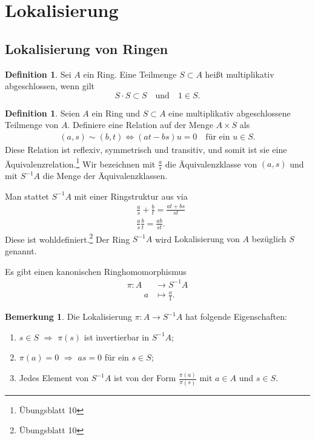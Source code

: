 \documentclass[reqno,12pt]{article}
\numberwithin{equation}{section}
\theoremstyle{plain}
\theoremstyle{definition}
\newtheorem{definition}[thm]{Definition}
\newtheorem{remark}[thm]{Bemerkung}
\begin{document}
\newpage
\section{Lokalisierung}


\subsection{Lokalisierung von Ringen}

\begin{definition}
Sei $A$ ein Ring. Eine Teilmenge $S \subset A$ heißt {\sf multiplikativ abgeschlossen}, wenn gilt
$$
S \cdot S \subset S \quad \text{und} \quad 1 \in S.
$$
\end{definition}

\begin{definition}
Seien $A$ ein Ring und $S \subset A$ eine multiplikativ abgeschlossene Teilmenge von $A$. Definiere eine Relation auf der Menge $A \times S$ als
\begin{align*}
(a,s) \sim (b,t) \iff (at-bs)u = 0 \quad \text{für ein }  u \in S.
\end{align*}
Diese Relation ist reflexiv, symmetrisch und transitiv, und somit ist sie eine Äquivalenzrelation.\footnote{Übungsblatt 10} Wir bezeichnen mit $\frac{a}{s}$ die Äquivalenzklasse von $(a,s)$ und mit $S^{-1}A$ die Menge der Äquivalenzklassen.

Man stattet $S^{-1}A$ mit einer Ringstruktur aus via
\begin{align*}
& \frac{a}{s} + \frac{b}{t} = \frac{at + bs}{st} \\
& \frac{a}{s} \frac{b}{t} = \frac{ab}{st}.
\end{align*}
Diese ist wohldefiniert.\footnote{Übungsblatt 10} Der Ring $S^{-1}A$ wird {\sf Lokalisierung von $A$ bezüglich $S$} genannt.

Es gibt einen kanonischen Ringhomomorphismus
\begin{align*}
\pi \colon A &\to S^{-1}A \\
\qquad a &\mapsto \frac{a}{1}.
\end{align*}
\end{definition}

\begin{remark}\label{remark: first-properties-of-localisation}
Die Lokalisierung $\pi \colon A \to S^{-1}A$ hat folgende Eigenschaften:
\begin{enumerate}
\item $s \in S$ $\Rightarrow$ $\pi(s)$ ist invertierbar in $S^{-1}A$;
\item $\pi(a)=0$ $\Rightarrow$ $as = 0$ für ein $s \in S$;
\item Jedes Element von $S^{-1}A$ ist von der Form $\frac{\pi(a)}{\pi(s)}$ mit $a \in A$ und $s \in S$.
\end{enumerate}
\end{remark}
\end{document}
